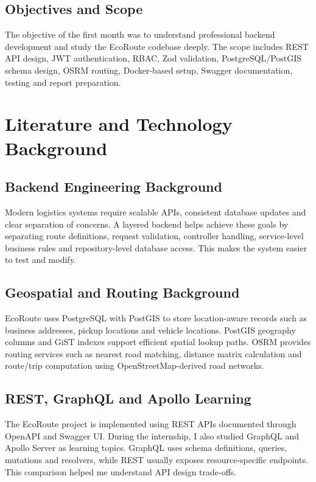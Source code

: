 \documentclass[12pt,a4paper]{report}
\newcommand{\chapterheader}{CHAPTER HEADING}
\begin{document}
\section{Objectives and Scope}
The objective of the first month was to understand professional backend development and study the EcoRoute codebase deeply. The scope includes REST API design, JWT authentication, RBAC, Zod validation, PostgreSQL/PostGIS schema design, OSRM routing, Docker-based setup, Swagger documentation, testing and report preparation.
\clearpage

\renewcommand{\chapterheader}{CHAPTER 2}
\chapter{Literature and Technology Background}
\section{Backend Engineering Background}
Modern logistics systems require scalable APIs, consistent database updates and clear separation of concerns. A layered backend helps achieve these goals by separating route definitions, request validation, controller handling, service-level business rules and repository-level database access. This makes the system easier to test and modify.

\section{Geospatial and Routing Background}
EcoRoute uses PostgreSQL with PostGIS to store location-aware records such as business addresses, pickup locations and vehicle locations. PostGIS geography columns and GiST indexes support efficient spatial lookup paths. OSRM provides routing services such as nearest road matching, distance matrix calculation and route/trip computation using OpenStreetMap-derived road networks.

\section{REST, GraphQL and Apollo Learning}
The EcoRoute project is implemented using REST APIs documented through OpenAPI and Swagger UI. During the internship, I also studied GraphQL and Apollo Server as learning topics. GraphQL uses schema definitions, queries, mutations and resolvers, while REST usually exposes resource-specific endpoints. This comparison helped me understand API design trade-offs.
\clearpage
\end{document}
